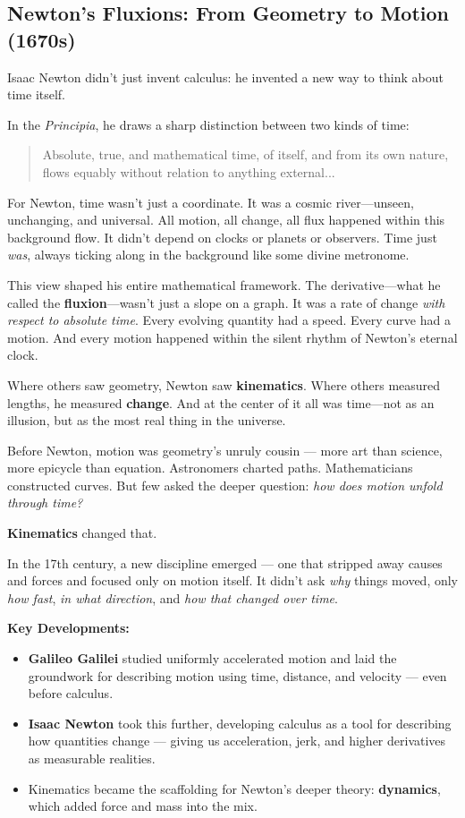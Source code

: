 \subsection{Newton’s Fluxions: From Geometry to Motion (1670s)}

  Isaac Newton didn’t just invent calculus: he invented a new way to think about time itself.
  
  In the \textit{Principia}, he draws a sharp distinction between two kinds of time:

  \begin{quote}
  Absolute, true, and mathematical time, of itself, and from its own nature, flows equably without relation to anything external...
  \end{quote}
  
  For Newton, time wasn’t just a coordinate. It was a cosmic river—unseen, unchanging, and universal. All motion, all change, all flux happened within this background flow. It didn’t depend on clocks or planets or observers. Time just \textit{was}, always ticking along in the background like some divine metronome.
  
  This view shaped his entire mathematical framework. The derivative—what he called the \textbf{fluxion}—wasn’t just a slope on a graph. It was a rate of change \textit{with respect to absolute time}. Every evolving quantity had a speed. Every curve had a motion. And every motion happened within the silent rhythm of Newton’s eternal clock.
  

  Where others saw geometry, Newton saw \textbf{kinematics}. Where others measured lengths, he measured \textbf{change}. And at the center of it all was time—not as an illusion, but as the most real thing in the universe.

    Before Newton, motion was geometry's unruly cousin — more art than science, more epicycle than equation. Astronomers charted paths. Mathematicians constructed curves. But few asked the deeper question: \textit{how does motion unfold through time?}

    \textbf{Kinematics} changed that.
    
    In the 17th century, a new discipline emerged — one that stripped away causes and forces and focused only on motion itself. It didn’t ask \textit{why} things moved, only \textit{how fast}, \textit{in what direction}, and \textit{how that changed over time}.

    \textbf{Key Developments:}
    

    \begin{itemize}
      \item \textbf{Galileo Galilei} studied uniformly accelerated motion and laid the groundwork for describing motion using time, distance, and velocity — even before calculus.
      \item \textbf{Isaac Newton} took this further, developing calculus as a tool for describing how quantities change — giving us acceleration, jerk, and higher derivatives as measurable realities.
      \item Kinematics became the scaffolding for Newton’s deeper theory: \textbf{dynamics}, which added force and mass into the mix.
    \end{itemize}
    

